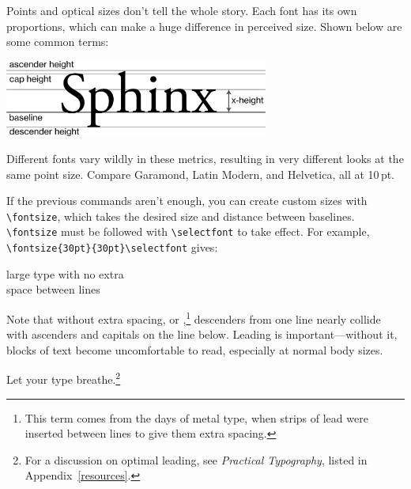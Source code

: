 Points and optical sizes don't tell the whole story.
Each font has its own proportions, which can make a huge difference
in perceived size.
Shown below are some common terms:
\begin{centerfigure}
\includegraphics[keepaspectratio,width=0.65\textwidth]{heights.png}

\end{centerfigure}
Different fonts vary wildly in these metrics,
resulting in very different looks at the same point size.
Compare Garamond, { Latin Modern},
and {Helvetica}, all at 10\,pt.

If the previous commands aren't enough, you can create custom sizes with
\verb|\fontsize|, which takes the desired size and distance between baselines.
\verb|\fontsize| must be followed with \verb|\selectfont| to take effect.
For example, \verb|\fontsize{30pt}{30pt}\selectfont|
gives:
\begin{leftfigure}
\lm
\fontsize{30pt}{30pt}\selectfont
large type with no extra \\
space between lines
\end{leftfigure}
{\fontsize{10pt}{10pt}\selectfont
Note that without extra spacing,
or ,\punckern\footnote{This term comes from the days of
metal type, when strips of lead were inserted
between lines to give them extra spacing.}
descenders from one line nearly collide with ascenders and capitals on
the line below.
Leading is important---without it, blocks of text become uncomfortable to
read, especially at normal body sizes.\par}
Let your type breathe.\punckern\footnote{For a discussion on optimal leading,
see \textit{Practical Typography}, listed in Appendix~\ref{resources}.}

